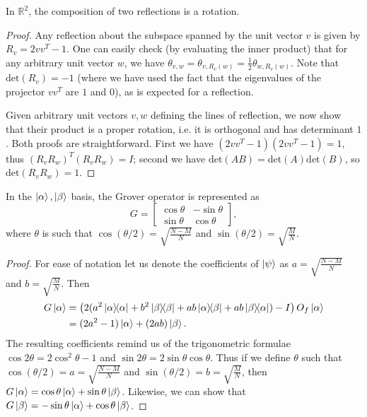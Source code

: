 \begin{enumerate}
    \begin{lemma}
        In $\mathbb{R}^2$, the composition of two reflections is a rotation.
    \end{lemma}
    \begin{proof}
        Any reflection about the subspace spanned by the unit vector $v$ is given by $R_v = 2vv^T-1$. One can easily check (by evaluating the inner product) that for any arbitrary unit vector $w$, we have $\theta_{v,w} = \theta_{v,R_v(w)} = \frac{1}{2}\theta_{w,R_v(w)}$. Note that $\text{det}(R_v) = -1$ (where we have used the fact that the eigenvalues of the projector $vv^T$ are $1$ and $0$), as is expected for a reflection.

        Given arbitrary unit vectors $v,w$ defining the lines of reflection, we now show that their product is a proper rotation, i.e. it is orthogonal and has determinant $1$. Both proofs are straightforward. First we have $(2vv^T-1)(2vv^T-1) = 1$, thus $(R_vR_w)^T (R_vR_w) = I$; second we have $\text{det}(AB) = \text{det}(A)\text{det}(B)$, so $\text{det}(R_vR_w) = 1$.
    \end{proof}

    \begin{proposition}
        In the $\ket{\alpha},\ket{\beta}$ basis, the Grover operator is represented as
        \[
            G = 
            \begin{bmatrix}
                \cos \theta & -\sin \theta\\
                \sin \theta &
                \cos \theta
            \end{bmatrix},
        \]
        where $\theta$ is such that $\cos(\theta/2) = \sqrt{\frac{N-M}{N}}$ and $\sin(\theta/2) = \sqrt{\frac{M}{N}}$.
    \end{proposition}
    \begin{proof}
        For ease of notation let us denote the coefficients of $\ket{\psi}$ as $a=\sqrt{\frac{N-M}{N}}$ and $b=\sqrt{\frac{M}{N}}$. Then
        \begin{align*}
            G\ket{\alpha} &= \left( 2(a^2\ketbra{\alpha}{\alpha} + b^2\ketbra{\beta}{\beta} + ab\ketbra{\alpha}{\beta} + ab\ketbra{\beta}{\alpha}) - I \right)O_f\ket{\alpha}\\
            &= (2a^2-1)\ket{\alpha} + (2ab)\ket{\beta}.
        \end{align*}
        The resulting coefficients remind us of the trigonometric formulae $\cos 2\theta = 2\cos^2\theta-1$ and $\sin 2\theta = 2\sin\theta\cos\theta$. Thus if we define $\theta$ such that $\cos(\theta/2) = a = \sqrt{\frac{N-M}{N}}$ and $\sin(\theta/2) = b = \sqrt{\frac{M}{N}}$, then $G\ket{\alpha} = \cos\theta\ket{\alpha} + \sin\theta\ket{\beta}$. Likewise, we can show that $G\ket{\beta} = -\sin\theta\ket{\alpha} + \cos\theta\ket{\beta}$.
    \end{proof}


\end{enumerate}
